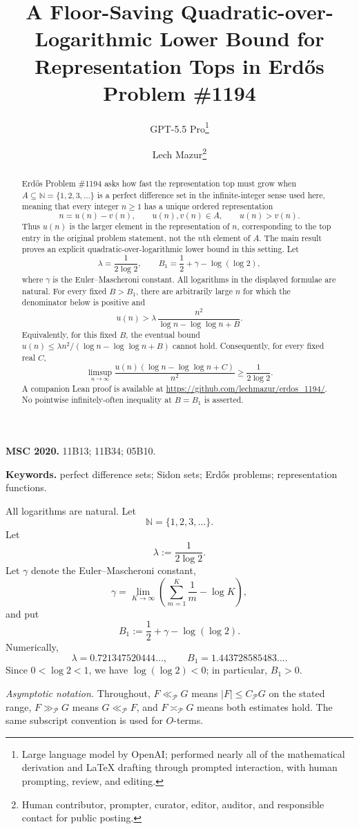 \documentclass[11pt]{article}
\title{A Floor-Saving Quadratic-over-Logarithmic Lower Bound for Representation Tops in Erd\H{o}s Problem \#1194}
\author{GPT-5.5 Pro\thanks{Large language model by OpenAI; performed nearly all of the mathematical derivation and LaTeX drafting through prompted interaction, with human prompting, review, and editing.}
\and
Lech Mazur\thanks{Human contributor, prompter, curator, editor, auditor, and responsible contact for public posting.}}
\date{}
\newcommand{\N}{\mathbb{N}}
\begin{document}
\maketitle

\begin{abstract}
Erd\H{o}s Problem \#1194 asks how fast the representation top must grow when
$A\subseteq\mathbb{N}=\{1,2,3,\ldots\}$ is a perfect difference set in the infinite-integer sense used here,
meaning that every integer $n\ge1$ has a unique ordered representation
\[
n=u(n)-v(n),
\qquad
u(n),v(n)\in A,
\qquad
u(n)>v(n).
\]
Thus $u(n)$ is the larger element in the representation of $n$, corresponding to the top entry
in the original problem statement, not the $n$th element of $A$. The main result proves an
explicit quadratic-over-logarithmic lower bound in this setting. Let
\[
\lambda=\frac1{2\log 2},
\qquad
B_1=\frac12+\gamma-\log(\log 2),
\]
where $\gamma$ is the Euler--Mascheroni constant. All logarithms in the displayed formulae are
natural. For every fixed $B>B_1$, there are arbitrarily large $n$ for which the denominator below is
positive and
\[
u(n)>\lambda\,\frac{n^2}{\log n-\log\log n+B}.
\]
Equivalently, for this fixed $B$, the eventual bound
$u(n)\le\lambda n^2/(\log n-\log\log n+B)$ cannot hold. Consequently, for every fixed real $C$,
\[
 \limsup_{n\to\infty}
 \frac{u(n)(\log n-\log\log n+C)}{n^2}
 \ge \frac1{2\log 2}.
\]
A companion Lean proof is available at
\url{https://github.com/lechmazur/erdos_1194/}. No pointwise infinitely-often inequality at
$B=B_1$ is asserted.

\end{abstract}

\medskip
\noindent\textbf{MSC 2020.} 11B13; 11B34; 05B10.

\noindent\textbf{Keywords.} perfect difference sets; Sidon sets; Erd\H{o}s problems; representation functions.

All logarithms are natural. Let
\[
\N=\{1,2,3,\ldots\}.
\]
Let
\[
\lambda:=\frac1{2\log 2}.
\]
Let $\gamma$ denote the Euler--Mascheroni constant,
\[
\gamma=\lim_{K\to\infty}\left(\sum_{m=1}^K\frac1m-\log K\right),
\]
and put
\[
B_1:=\frac12+\gamma-\log(\log 2).
\]
Numerically,
\[
\lambda=0.721347520444\ldots,
\qquad
B_1=1.443728585483\ldots.
\]
Since $0<\log 2<1$, we have $\log(\log 2)<0$; in particular, $B_1>0$.

\medskip
\noindent\textit{Asymptotic notation.} Throughout, $F\ll_{\mathcal P}G$ means
$|F|\le C_{\mathcal P}G$ on the stated range, $F\gg_{\mathcal P}G$ means
$G\ll_{\mathcal P}F$, and $F\asymp_{\mathcal P}G$ means both estimates hold. The same
subscript convention is used for $O$-terms.
\end{document}
